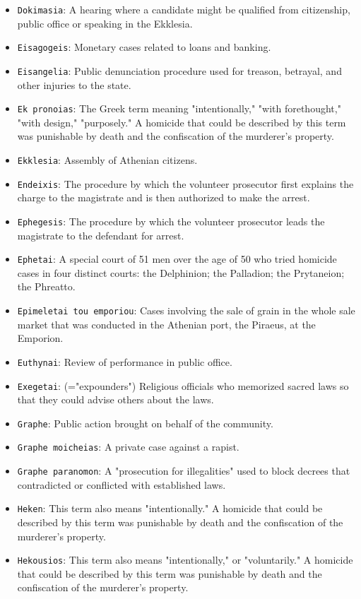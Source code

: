 \documentclass[11pt]{article}
\begin{document}
\begin{itemize}
\item \texttt{Dokimasia}: A hearing where a candidate might be qualified from citizenship, public office or speaking in the Ekklesia.
\item \texttt{Eisagogeis}: Monetary cases related to loans and banking.
\item \texttt{Eisangelia}: Public denunciation procedure used for treason, betrayal, and other injuries to the state.
\item \texttt{Ek pronoias}: The Greek term meaning "intentionally," "with forethought," "with design," "purposely." A homicide that could be described by this term was punishable by death and the confiscation of the murderer's property.
\item \texttt{Ekklesia}: Assembly of Athenian citizens.
\item \texttt{Endeixis}: The procedure by which the volunteer prosecutor first explains the charge to the magistrate and is then authorized to make the arrest.
\item \texttt{Ephegesis}: The procedure by which the volunteer prosecutor leads the magistrate to the defendant for arrest.
\item \texttt{Ephetai}: A special court of 51 men over the age of 50 who tried homicide cases in four distinct courts: the Delphinion; the Palladion; the Prytaneion; the Phreatto.
\item \texttt{Epimeletai tou emporiou}: Cases involving the sale of grain in the whole sale market that was conducted in the Athenian port, the Piraeus, at the Emporion.
\item \texttt{Euthynai}: Review of performance in public office.
\item \texttt{Exegetai}: (="expounders") Religious officials who memorized sacred laws so that they could advise others about the laws.
\item \texttt{Graphe}: Public action brought on behalf of the community.
\item \texttt{Graphe moicheias}: A private case against a rapist.
\item \texttt{Graphe paranomon}: A "prosecution for illegalities" used to block decrees that contradicted or conflicted with established laws.
\item \texttt{Heken}: This term also means "intentionally." A homicide that could be described by this term was punishable by death and the confiscation of the murderer's property.
\item \texttt{Hekousios}: This term also means "intentionally," or "voluntarily." A homicide that could be described by this term was punishable by death and the confiscation of the murderer's property.

\end{itemize}
\end{document}
